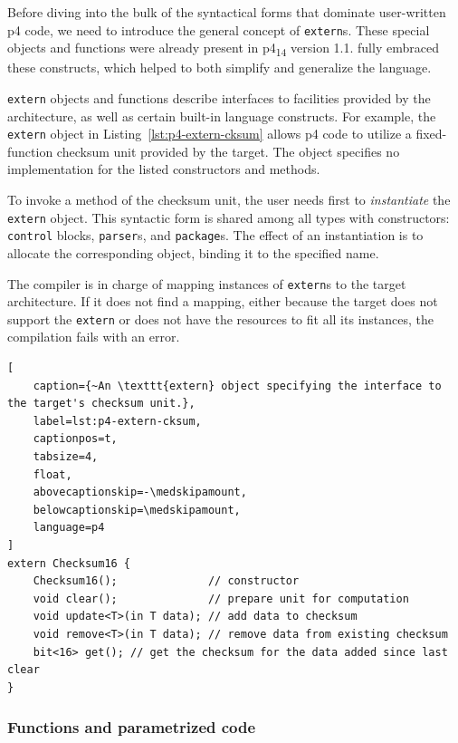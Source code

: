 Before diving into the bulk of the syntactical forms that dominate user-written
\acrshort{p4} code, we need to introduce the general concept of
\texttt{extern}s. These special objects and functions were already present in
\acrshort{p4}\textsubscript{14} version 1.1. \pfs fully embraced these
constructs, which helped to both simplify and generalize the language.

\texttt{extern} objects and functions describe interfaces to facilities provided
by the architecture, as well as certain built-in language
constructs. For example,
the \texttt{extern} object in Listing~\ref{lst:p4-extern-cksum} allows
\acrshort{p4} code to utilize a fixed-function checksum unit provided by the
target. The object specifies no implementation for the listed constructors and
methods.

To invoke a method of the checksum unit, the user needs first to
\emph{instantiate} the \texttt{extern} object. This syntactic form is shared
among all types with constructors: \texttt{control} blocks, \texttt{parser}s,
and \texttt{package}s. The effect of an
instantiation is to allocate the corresponding object, binding it to the
specified name.

The compiler is in charge of mapping instances of \texttt{extern}s to the target
architecture. If it does not find a mapping, either because the target does not
support the \texttt{extern} or does not have the resources to fit all its
instances, the compilation fails with an error.

\begin{lstlisting}[
	caption={~An \texttt{extern} object specifying the interface to the target's checksum unit.},
	label=lst:p4-extern-cksum,
	captionpos=t,
	tabsize=4,
	float,
	abovecaptionskip=-\medskipamount,
	belowcaptionskip=\medskipamount,
	language=p4
]
extern Checksum16 {
	Checksum16();              // constructor
	void clear();              // prepare unit for computation
	void update<T>(in T data); // add data to checksum
	void remove<T>(in T data); // remove data from existing checksum
	bit<16> get(); // get the checksum for the data added since last clear
}
\end{lstlisting}

\subsubsection*{Functions and parametrized code}

